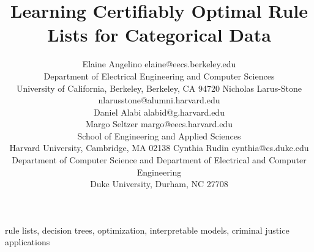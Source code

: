 \documentclass[twoside,11pt]{article}
\begin{document}
\title{Learning Certifiably Optimal Rule Lists for Categorical Data}

\author{\name Elaine Angelino \email elaine@eecs.berkeley.edu \\
        \addr Department of Electrical Engineering and Computer Sciences\\
        University of California, Berkeley,
        Berkeley, CA 94720
        \AND
        \name Nicholas Larus-Stone \email nlarusstone@alumni.harvard.edu \\
        \name Daniel Alabi \email alabid@g.harvard.edu \\
        \name Margo Seltzer \email margo@eecs.harvard.edu \\
        \addr School of Engineering and Applied Sciences\\
        Harvard University,
        Cambridge, MA 02138
        \AND
        \name Cynthia Rudin \email cynthia@cs.duke.edu \\
        \addr Department of Computer Science and
        Department of Electrical and Computer Engineering\\
        Duke University,
        Durham, NC 27708}


\maketitle

\begin{abstract}%

\end{abstract}

\begin{keywords}
    rule lists, decision trees, optimization, interpretable models, criminal justice applications
\end{keywords}














\end{document}
